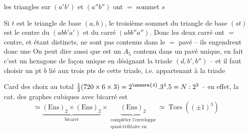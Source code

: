 les triangles sur $(a'b')$ et $(a''b'')$ ont $=$ sommet $s$

Si $t$ est le  triangle de base $(a,b)$, le  troisième sommet  du triangle de base $(st)$ est le centre du  $(abb'a')$ et du carré $(abb''a'')$. Donc les deux carré ont $=$ centre, et étant distincts, ne sont pas contenus dans le $=$ pavé -- ils engendrent donc une  On peut dire aussi que
est un $A_5$ contenu dans un pavé unique, en fait c'est un hexagone  de façon unique en désignant la triade $(d,b',b'')$ -- et il faut choisir un pt $b$ lié aux trois pts de cette triade, i.e. appartenant à la triade 

Card des choix au total $\tfrac12(720\times6\times3)=2^{\unsure{4}}.3^4.5=N:2^3$ -- en effet, la cat. des  graphes cubiques avec bicarré est
\[
\simeq\underbrace{(\mathrm{Ens})_2\times(\mathrm{Ens})_2}_{\text{bicarré}}\times
\underbrace{(\mathrm{Ens})_2}_{\substack{\text{compléter l'enveloppe}\\\text{quasi-trilitaire en}}}
\simeq\operatorname{Tors}((\pm1)^3)
\]
